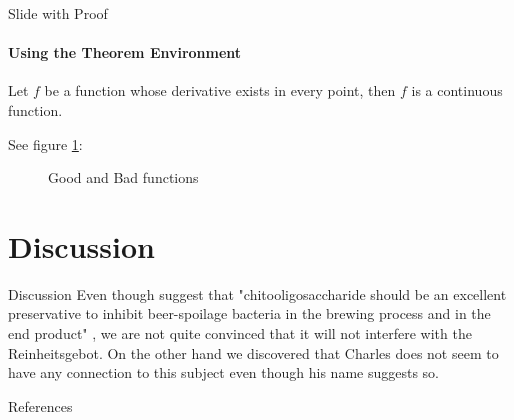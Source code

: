 \documentclass[10pt]{beamer}
\begin{document}
\begin{frame}{Slide with Proof}
\framesubtitle{Using the Theorem Environment}

	\begin{theorem}
	Let \(f\) be a function whose derivative exists in every point, then \(f\) 
	is a continuous function.
	\end{theorem}
	See figure \ref{figure1}:

	\begin{figure}
		\centering 
		\qquad
		\caption{Good and Bad functions}
		\label{figure1}
	\end{figure}

\end{frame}


\section{Discussion}
\begin{frame}{Discussion}
Even though \cite{Zhao2015} suggest that "chitooligosaccharide should be an excellent preservative to inhibit beer-spoilage bacteria in the brewing process and in the end product" , we are not quite convinced that it will not interfere with the Reinheitsgebot. On the other hand we discovered that Charles \cite{Beer2003} does not seem to have any connection to this subject even though his name suggests so.
\end{frame} 


\begin{frame}[allowframebreaks]{References}

\printbibliography

\end{frame}
\end{document}
